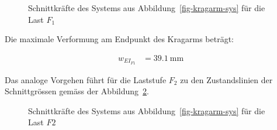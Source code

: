 \documentclass[
  11pt,
  letterpaper,
]{scrreprt}
\begin{document}
\begin{figure}[H]


\caption{\label{fig-skkragarmreal}Schnittkräfte des Systems aus
Abbildung~\ref{fig-kragarm-sys} für die Last \(F_1\)}

\end{figure}%

Die maximale Verformung am Endpunkt des Kragarms beträgt:

$$
\begin{aligned}
w_{EI_{F1}} &= 39.1\ \mathrm{mm} \;
\end{aligned}
$$

Das analoge Vorgehen führt für die Laststufe \(F_2\) zu den
Zustandslinien der Schnittgrössen gemäss der
Abbildung~\ref{fig-skkragarmreal_high}.

\begin{figure}[H]


\caption{\label{fig-skkragarmreal_high}Schnittkräfte des Systems aus
Abbildung~\ref{fig-kragarm-sys} für die Last \(F2\)}

\end{figure}%
\end{document}
